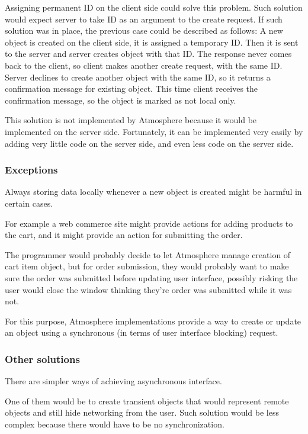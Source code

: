 Assigning permanent ID on the client side could solve this problem. Such solution would expect server to take ID as an argument to the create request. If such solution was in place, the previous case could be described as follows: A new object is created on the client side, it is assigned a temporary ID. Then it is sent to the server and server creates object with that ID. The response never comes back to the client, so client makes another create request, with the same ID. Server declines to create another object with the same ID, so it returns a confirmation message for existing object. This time client receives the confirmation message, so the object is marked as not local only. 

This solution is not implemented by Atmosphere because it would be implemented on the server side. Fortunately, it can be implemented very easily by adding very little code on the server side, and even less code on the server side. 

\subsubsection{Exceptions}

Always storing data locally whenever a new object is created might be harmful in certain cases.

For example a web commerce site might provide actions for adding products to the cart, and it might provide an action for submitting the order.

The programmer would probably decide to let Atmosphere manage creation of cart item object, but for order submission, they would probably want to make sure the order was submitted before updating user interface, possibly risking the user would close the window thinking they’re order was submitted while it was not.

For this purpose, Atmosphere implementations provide a way to create or update an object using a synchronous (in terms of user interface blocking) request. 

\subsubsection{Other solutions}

There are simpler ways of achieving asynchronous interface.

One of them would be to create transient objects that would represent remote objects and still hide networking from the user. Such solution would be less complex because there would have to be no synchronization.

